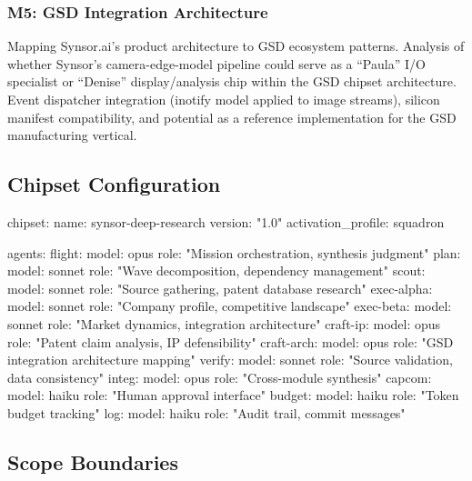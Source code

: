 \documentclass[11pt,letterpaper]{article}
\begin{document}
\subsubsection{M5: GSD Integration Architecture}

Mapping Synsor.ai's product architecture to GSD ecosystem patterns. Analysis of whether Synsor's camera-edge-model pipeline could serve as a ``Paula'' I/O specialist or ``Denise'' display/analysis chip within the GSD chipset architecture. Event dispatcher integration (inotify model applied to image streams), silicon manifest compatibility, and potential as a reference implementation for the GSD manufacturing vertical.

\subsection{Chipset Configuration}

\begin{asciibox}
chipset:
  name: synsor-deep-research
  version: "1.0"
  activation\_profile: squadron

  agents:
    flight:
      model: opus
      role: "Mission orchestration, synthesis judgment"
    plan:
      model: sonnet
      role: "Wave decomposition, dependency management"
    scout:
      model: sonnet
      role: "Source gathering, patent database research"
    exec-alpha:
      model: sonnet
      role: "Company profile, competitive landscape"
    exec-beta:
      model: sonnet
      role: "Market dynamics, integration architecture"
    craft-ip:
      model: opus
      role: "Patent claim analysis, IP defensibility"
    craft-arch:
      model: opus
      role: "GSD integration architecture mapping"
    verify:
      model: sonnet
      role: "Source validation, data consistency"
    integ:
      model: opus
      role: "Cross-module synthesis"
    capcom:
      model: haiku
      role: "Human approval interface"
    budget:
      model: haiku
      role: "Token budget tracking"
    log:
      model: haiku
      role: "Audit trail, commit messages"
\end{asciibox}

\subsection{Scope Boundaries}
\end{document}
